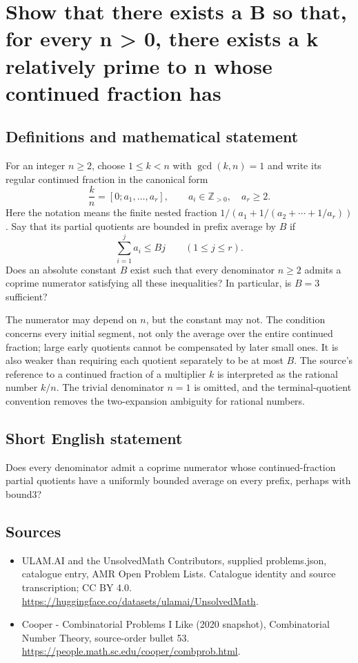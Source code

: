 \documentclass[11pt,a4paper]{article}
\begin{document}
\section*{Show that there exists a B so that, for every n > 0, there exists a k relatively prime to n whose continued fraction has}\label{statement}

\subsection{Definitions and mathematical statement}
For an integer $n\ge2$, choose $1\le k<n$ with $\gcd(k,n)=1$
and write its regular continued fraction in the canonical form
\[
       \frac{k}{n}=[0;a_1,\ldots,a_r],
       \qquad a_i\in\mathbb Z_{>0},\quad a_r\ge2.
\]
Here the notation means the finite nested fraction
$1/(a_1+1/(a_2+\cdots+1/a_r))$. Say that its partial quotients
are bounded in prefix average by $B$ if
\[
                    \sum_{i=1}^{j}a_i\le Bj
                         \qquad(1\le j\le r).
\]
Does an absolute constant $B$ exist such that every denominator
$n\ge2$ admits a coprime numerator satisfying all these inequalities?
In particular, is $B=3$ sufficient?

The numerator may depend on $n$, but the constant may not. The
condition concerns every initial segment, not only the average
over the entire continued fraction; large early quotients cannot
be compensated by later small ones. It is also weaker than
requiring each quotient separately to be at most $B$.
The source's reference to a continued fraction of a multiplier
$k$ is interpreted as the rational number $k/n$. The trivial
denominator $n=1$ is omitted, and the terminal-quotient convention
removes the two-expansion ambiguity for rational numbers.
\subsection{Short English statement}
Does every denominator admit a coprime numerator whose continued-fraction partial quotients have a uniformly bounded average on every prefix, perhaps with bound3?
\subsection{Sources}
\begin{itemize}
\item[S1] ULAM.AI and the UnsolvedMath Contributors, supplied problems.json, catalogue entry, AMR Open Problem Lists. Catalogue identity and source transcription; CC BY 4.0.
\url{https://huggingface.co/datasets/ulamai/UnsolvedMath}.
\item[S2] Cooper - Combinatorial Problems I Like (2020 snapshot), Combinatorial Number Theory, source-order bullet 53. 
\url{https://people.math.sc.edu/cooper/combprob.html}.
\end{itemize}
\end{document}
